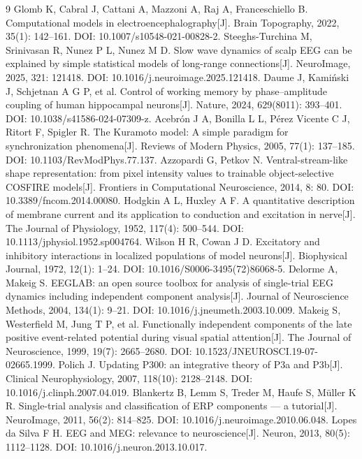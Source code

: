 \documentclass[bwprint]{gmcmthesis}
\begin{document}
\begin{thebibliography}{9}
 Glomb K, Cabral J, Cattani A, Mazzoni A, Raj A, Franceschiello B. Computational models in electroencephalography[J]. Brain Topography, 2022, 35(1): 142--161. DOI: 10.1007/s10548-021-00828-2.
 Steeghs-Turchina M, Srinivasan R, Nunez P L, Nunez M D. Slow wave dynamics of scalp EEG can be explained by simple statistical models of long-range connections[J]. NeuroImage, 2025, 321: 121418. DOI: 10.1016/j.neuroimage.2025.121418.
 Daume J, Kami\'nski J, Schjetnan A G P, et al. Control of working memory by phase--amplitude coupling of human hippocampal neurons[J]. Nature, 2024, 629(8011): 393--401. DOI: 10.1038/s41586-024-07309-z.
 Acebr\'on J A, Bonilla L L, P\'erez Vicente C J, Ritort F, Spigler R. The Kuramoto model: A simple paradigm for synchronization phenomena[J]. Reviews of Modern Physics, 2005, 77(1): 137--185. DOI: 10.1103/RevModPhys.77.137.
 Azzopardi G, Petkov N. Ventral-stream-like shape representation: from pixel intensity values to trainable object-selective COSFIRE models[J]. Frontiers in Computational Neuroscience, 2014, 8: 80. DOI: 10.3389/fncom.2014.00080.
 Hodgkin A L, Huxley A F. A quantitative description of membrane current and its application to conduction and excitation in nerve[J]. The Journal of Physiology, 1952, 117(4): 500--544. DOI: 10.1113/jphysiol.1952.sp004764.
 Wilson H R, Cowan J D. Excitatory and inhibitory interactions in localized populations of model neurons[J]. Biophysical Journal, 1972, 12(1): 1--24. DOI: 10.1016/S0006-3495(72)86068-5.
 Delorme A, Makeig S. EEGLAB: an open source toolbox for analysis of single-trial EEG dynamics including independent component analysis[J]. Journal of Neuroscience Methods, 2004, 134(1): 9--21. DOI: 10.1016/j.jneumeth.2003.10.009.
 Makeig S, Westerfield M, Jung T P, et al. Functionally independent components of the late positive event-related potential during visual spatial attention[J]. The Journal of Neuroscience, 1999, 19(7): 2665--2680. DOI: 10.1523/JNEUROSCI.19-07-02665.1999.
 Polich J. Updating P300: an integrative theory of P3a and P3b[J]. Clinical Neurophysiology, 2007, 118(10): 2128--2148. DOI: 10.1016/j.clinph.2007.04.019.
 Blankertz B, Lemm S, Treder M, Haufe S, M\"uller K R. Single-trial analysis and classification of ERP components --- a tutorial[J]. NeuroImage, 2011, 56(2): 814--825. DOI: 10.1016/j.neuroimage.2010.06.048.
 Lopes da Silva F H. EEG and MEG: relevance to neuroscience[J]. Neuron, 2013, 80(5): 1112--1128. DOI: 10.1016/j.neuron.2013.10.017.

\end{thebibliography}
\end{document}
